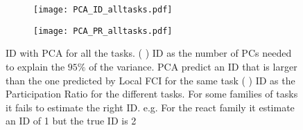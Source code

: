 \documentclass[11pt,a4paper]{article}
\begin{document}
\begin{figure}
    \centering
    \begin{subfigure}[b]{0.45\textwidth}
      \centering
      \texttt{[image: PCA\_ID\_alltasks.pdf]}
      \subcaption{}\label{fig:PCA_ID_alltasks:PCA}
    \end{subfigure}
    \begin{subfigure}[b]{0.45\textwidth}
      \centering
      \texttt{[image: PCA\_PR\_alltasks.pdf]}
      \subcaption{}\label{fig:PCA_ID_alltasks:PR}
    \end{subfigure}
    \caption{ID with PCA for all the tasks.
    ( )  ID as the number of PCs needed to explain the $95\%$ of the variance.
      PCA predict an ID that is larger than the one predicted by Local FCI for the same task
      ( ) ID as the Participation Ratio for the different tasks.
      For some families of tasks it fails to estimate the right ID.
       e.g. For the react family it estimate an ID of 1 but the true ID is 2
        }\label{fig:PCA_ID_alltasks}
\end{figure}
\end{document}
